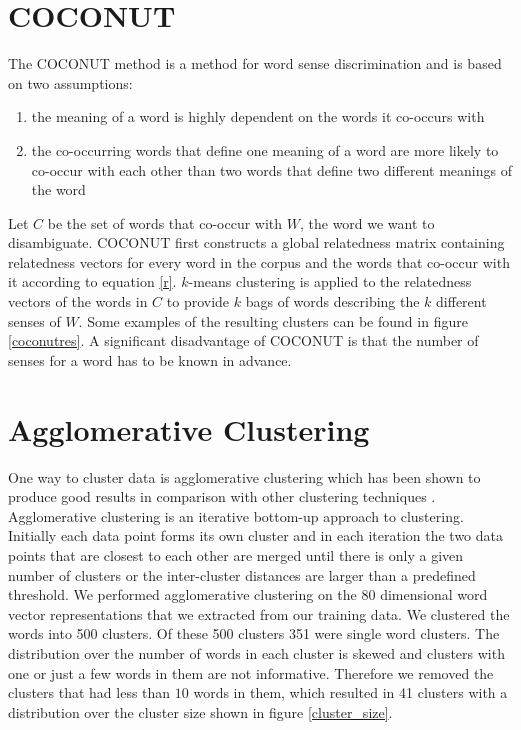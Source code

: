 \documentclass[11pt]{article}
\begin{document}
\section{COCONUT}
\label{coconut}
The COCONUT method is a method for word sense discrimination and is based on two assumptions:
\begin{enumerate}
\item the meaning of a word is highly dependent on the words it co-occurs with
\item the co-occurring words that define one meaning of a word are more likely to co-occur with each other than two words that define two different meanings of the word
\end{enumerate}
Let $C$ be the set of words that co-occur with $W$, the word we want to disambiguate. COCONUT first constructs a global relatedness matrix containing relatedness vectors for every word in the corpus and the words that co-occur with it according to equation \ref{r}. $k$-means clustering is applied to the relatedness vectors of the words in $C$ to provide $k$ bags of words describing the $k$ different senses of $W$. Some examples of the resulting clusters can be found in figure \ref{coconutres}. 
A significant disadvantage of COCONUT is that the number of senses for a word has to be known in advance. 

\section{Agglomerative Clustering}
\label{remi}
One way to cluster data is agglomerative clustering which has been shown to produce good results in comparison with other clustering techniques \cite{clustering}. Agglomerative clustering is an iterative bottom-up approach to clustering. Initially each data point forms its own cluster and in each iteration the two data points that are closest to each other are merged until there is only a given number of clusters or the inter-cluster distances are larger than a predefined threshold. We performed agglomerative clustering on the $80$ dimensional word vector representations that we extracted from our training data. We clustered the words into 500 clusters. Of these 500 clusters 351 were single word clusters. The distribution over the number of words in each cluster is skewed and clusters with one or just a few words in them are not informative. Therefore we removed the clusters that had less than $10$ words in them, which resulted in 41 clusters with a distribution over the cluster size shown in figure \ref{cluster_size}.
\end{document}
